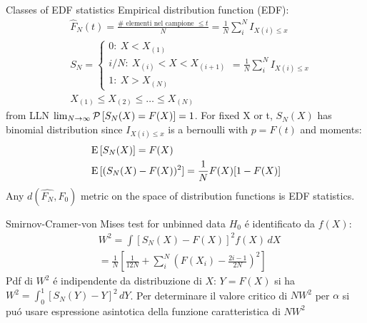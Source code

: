 \documentclass[asd-beamer.tex]{subfiles}%
\begin{document}
\begin{frame}{Classes of EDF statistics}
	Empirical distribution function (EDF): 
	\begin{align*}
	&\hat{F}_N(t)=\frac{\#\text{ elementi nel campione }\leq t}{N}=\frac{1}{N}\sum_i^NI_{X(i)\leq x}\\
	&S_N=\left\{\begin{array}{l}0:\ X<X_{(1)}\\i/N:\ X_{(i)}<X<X_{(i+1)}\\1:\ X>X_{(N)}\end{array}\right.=\frac{1}{N}\sum_i^NI_{X(i)\leq x}\\
	&X_{(1)}\leq X_{(2)}\leq\ldots\leq X_{(N)}
	\end{align*}
from LLN $\lim_{N\to\infty}\operatorname{\mathcal{P}}{[S_N(X)=F(X)]}=1$. For fixed X or t, $S_N(X)$ has binomial distribution since $I_{X(i)\leq x}$ is a bernoulli with $p=F(t)$ and moments:
\begin{align*}
&\operatorname{E}{[S_N(X)]}=F(X)\\
&\operatorname{E}{[(S_N(X)-F(X))^2]}=\frac{1}{N}F(X)[1-F(X)]
\end{align*}
Any $d(\hat{F_N},F_0)$ metric on the space of distribution functions is EDF statistics.
\end{frame}

\begin{frame}{Smirnov-Cramer-von Mises test for unbinned data}
$H_0$ \'e identificato da $f(X)$:
\begin{align*}
&W^2=\int[S_N(X)-F(X)]^2f(X)\,dX\\
&=\frac{1}{N}[\frac{1}{12N}+\sum_i^N(F(X_i)-\frac{2i-1}{2N})^2]
\end{align*}
Pdf di $W^2$ \'e indipendente da distribuzione di $X$: $Y=F(X)$ si ha
$W^2=\int_0^1[S_N(Y)-Y]^2\,dY$.
Per determinare il valore critico di $NW^2$ per $\alpha$ si pu\'o usare espressione asintotica della funzione caratteristica di $NW^2$
\end{frame}
\end{document}
